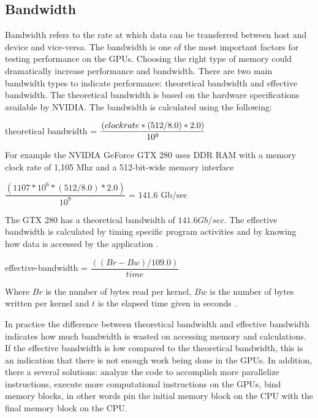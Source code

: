 \subsection{Bandwidth}

Bandwidth refers to the rate at which data can be transferred between host and device and vice-versa. The bandwidth is one of the most important factors for testing performance on the GPUs. Choosing the right type of memory could dramatically increase performance and bandwidth. There are two main bandwidth types to indicate performance: theoretical bandwidth and effective bandwidth. The theoretical bandwidth is based on the hardware specifications available by NVIDIA. The bandwidth is calculated using the following:

\vspace{0.8em}
\begin{center}
 {\listf theoretical bandwidth} = $\dfrac{({\listf clock rate} * (512 / 8.0 ) * 2.0)} { 10^{9}}$
\end{center}
\vspace{0.8em}

For example the NVIDIA GeForce GTX 280 uses DDR RAM with a memory clock rate of 1,105 Mhz and a 512-bit-wide memory interface

\vspace{0.8em}
\begin{center}
$\dfrac{(1107 * 10^6 * (512/8.0) * 2.0 )}{10^9}$ = $141.6$ Gb/sec
\end{center}
\vspace{0.8em}

The GTX 280 has a theoretical bandwidth of $141.6Gb/sec$. The effective bandwidth is calculated by timing specific program activities and by knowing how data is accessed by the application \cite{practices}.

\vspace{0.8em}
\begin{center}
{\listf effective-bandwidth} = $\dfrac{((Br - Bw) / 109.0 )}{time}$
\end{center}
\vspace{0.8em}

Where $Br$ is the number of bytes read per kernel, $Bw$ is the number of bytes written per kernel and  $t$ is the elapsed time given in seconds \cite{fortran}.

In practice the difference between theoretical bandwidth and effective bandwidth indicates how much bandwidth is wasted on accessing memory and calculations. If the effective bandwidth is low compared to the theoretical bandwidth, this is an indication that there is not enough work being done in the GPUs. In addition, there a several solutions: analyze the code to accomplish more parallelize instructions, execute more computational instructions on the GPUs, bind memory blocks, in other words pin the initial memory block on the CPU with the final memory  block on the CPU.


